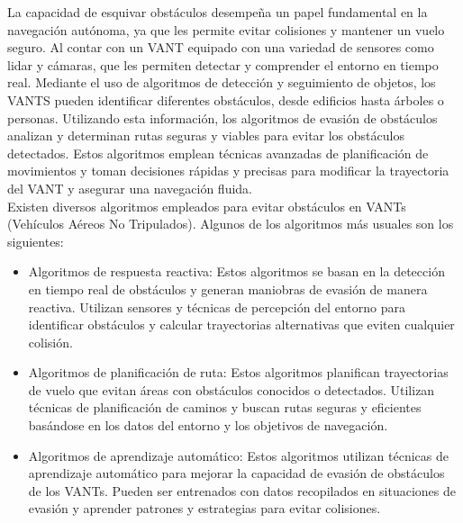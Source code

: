 \documentclass[sigconf]{acmart}
\begin{document}
La capacidad de esquivar obstáculos desempeña un papel fundamental en la navegación autónoma, ya que les permite evitar colisiones y mantener un vuelo seguro. Al contar con un VANT equipado con una variedad de sensores como lidar y cámaras, que les permiten detectar y comprender el entorno en tiempo real. Mediante el uso de algoritmos de detección y seguimiento de objetos, los VANTS pueden identificar diferentes obstáculos, desde edificios hasta árboles o personas. Utilizando esta información, los algoritmos de evasión de obstáculos analizan y determinan rutas seguras y viables para evitar los obstáculos detectados. Estos algoritmos emplean técnicas avanzadas de planificación de movimientos y toman decisiones rápidas y precisas para modificar la trayectoria del VANT y asegurar una navegación fluida.\\
Existen diversos algoritmos empleados para evitar obstáculos en VANTs (Vehículos Aéreos No Tripulados). Algunos de los algoritmos más usuales son los siguientes:

\begin{itemize}
\item Algoritmos de respuesta reactiva: Estos algoritmos se basan en la detección en tiempo real de obstáculos y generan maniobras de evasión de manera reactiva. Utilizan sensores y técnicas de percepción del entorno para identificar obstáculos y calcular trayectorias alternativas que eviten cualquier colisión.
\item Algoritmos de planificación de ruta: Estos algoritmos planifican trayectorias de vuelo que evitan áreas con obstáculos conocidos o detectados. Utilizan técnicas de planificación de caminos y buscan rutas seguras y eficientes basándose en los datos del entorno y los objetivos de navegación.
\item Algoritmos de aprendizaje automático: Estos algoritmos utilizan técnicas de aprendizaje automático para mejorar la capacidad de evasión de obstáculos de los VANTs. Pueden ser entrenados con datos recopilados en situaciones de evasión y aprender patrones y estrategias para evitar colisiones.
\end{itemize}
  
\end{document}
